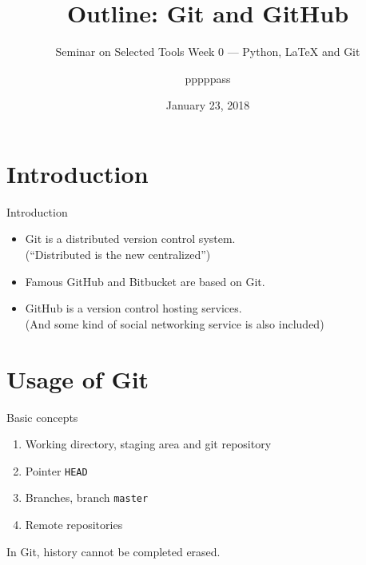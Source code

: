 \documentclass[english, nochinese]{../TeXTemplate/pkuslide}
\title{Outline: Git and GitHub}
\subtitle{Seminar on Selected Tools Week 0 --- Python, \texorpdfstring{\LaTeX}{LaTeX} and Git}
\author{pppppass}
\date{January 23, 2018}
\begin{document}
\begin{frame}
\titlepage
\end{frame}

\begin{frame}
\tableofcontents[subsectionstyle=show]
\end{frame}

\section{Introduction}

\begin{frame}
\sectionpage
\end{frame}

\begin{frame}{Introduction}
\begin{itemize}
\item Git is a distributed version control system. \\
(``Distributed is the new centralized'')
\item Famous GitHub and Bitbucket are based on Git.
\item GitHub is a version control hosting services. \\
(And some kind of social networking service is also included)
\end{itemize}
\end{frame}

\section{Usage of Git}

\begin{frame}
\sectionpage
\end{frame}

\begin{frame}[fragile]{Basic concepts}
\begin{enumerate}
\item Working directory, staging area and git repository
\item Pointer \verb"HEAD"
\item Branches, branch \verb"master"
\item Remote repositories
\end{enumerate}
In Git, history \alert{cannot} be completed erased.
\end{frame}
\end{document}
